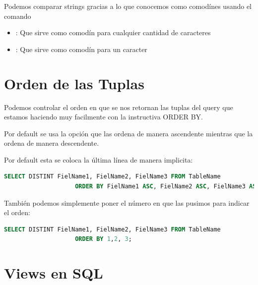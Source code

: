 \documentclass[12pt, fleqn]{report}                             %
\newcommand \Quote {\qq}                                        %
\begin{document}
            Podemos comparar strings gracias a lo que conocemos como comodínes usando
            el comando \Quote{LIKE}
            \begin{itemize}
                \item \Quote{\%}: Que sirve como comodín para cualquier cantidad de caracteres 
                \item \Quote{\_}: Que sirve como comodín para un caracter 
            \end{itemize}


        \section{Orden de las Tuplas}

            Podemos controlar el orden en que se nos retornan las tuplas del query que estamos
            haciendo muy facilmente con la instructiva ORDER BY.

            Por default se usa la opción \Quote{ASC} que las ordena de manera ascendente
            mientras que \Quote{DESC} la ordena de manera descendente.

            Por default esta se coloca la última línea de manera implicita:
            \begin{lstlisting}[language=SQL, gobble=16]
                SELECT DISTINT FielName1, FielName2, FielName3 FROM TableName
                    ORDER BY FielName1 ASC, FielName2 ASC, FielName3 ASC;
            \end{lstlisting}

            También podemos simplemente poner el número en que las pusimos para 
            indicar el orden:

            \begin{lstlisting}[language=SQL, gobble=16]
                SELECT DISTINT FielName1, FielName2, FielName3 FROM TableName
                    ORDER BY 1,2, 3;
            \end{lstlisting}


    \section{Views en SQL}
\end{document}
